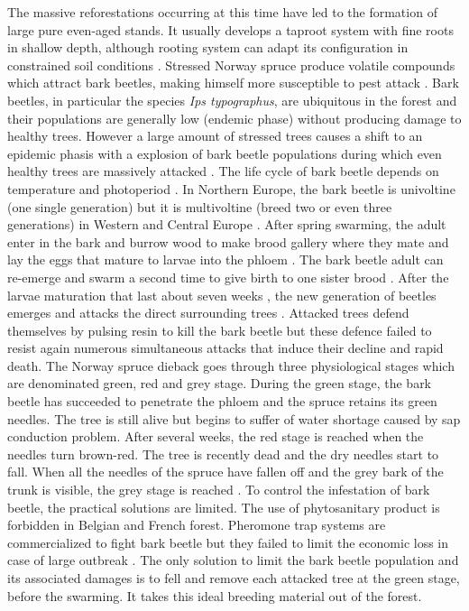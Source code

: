 \documentclass[3p,procedia]{elsarticle}
\begin{document}
The massive reforestations occurring at this time have led to the formation of large pure even-aged stands.
It usually develops a taproot system with fine roots in shallow depth, although rooting system can adapt its configuration in constrained soil conditions \citep{puhe_roots_2003,kostler_1968}.    
Stressed Norway spruce produce volatile compounds which attract bark beetles, making himself more susceptible to pest attack \citep{netherer_waterlimiting_2015,netherer_interactions_2021}.
Bark beetles, in particular the species \textit{Ips typographus}, are ubiquitous in the forest and their populations are generally low (endemic phase) without producing damage to healthy trees. 
However a large amount of stressed trees causes a shift to an epidemic phasis with a explosion of bark beetle populations during which even healthy trees are massively attacked \citep{kautz_individual_2014}.
The life cycle of bark beetle depends on temperature and photoperiod \citep{annila_influence_1969, baier_phenipscomprehensive_2007}.
In Northern Europe, the bark beetle is univoltine (one single generation) but it is multivoltine (breed two or even three generations) in Western and Central Europe \citep{annila_influence_1969}.
After spring swarming, the adult enter in the bark and burrow wood to make brood gallery where they mate and lay the eggs that mature to larvae into the phloem \citep{hlasny_bark_2021}.
The bark beetle adult can re-emerge and swarm a second time to give birth to one sister brood \citep{zolubas_1995}.
After the larvae maturation that last about seven weeks \citep{baier_phenipscomprehensive_2007}, the new generation of beetles emerges and attacks the direct surrounding trees \citep{zolubas_1995}.
Attacked trees defend themselves by pulsing resin to kill the bark beetle but these defence failed to resist again numerous simultaneous attacks that induce their decline and rapid death.
The Norway spruce dieback goes through three physiological stages which are denominated green, red and grey stage.
During the green stage, the bark beetle has succeeded to penetrate the phloem and the spruce retains its green needles. 
The tree is still alive but begins to suffer of water shortage caused by sap conduction problem. 
After several weeks, the red stage is reached when the needles turn brown-red. The tree is recently dead and the dry needles start to fall.
When all the needles of the spruce have fallen off and the grey bark of the trunk is visible, the grey stage is reached \citep{abdullah_european_2018}. 
To control the infestation of bark beetle, the practical solutions are limited. 
The use of phytosanitary product is forbidden in Belgian and French forest.
Pheromone trap systems are commercialized to fight bark beetle but they failed to limit the economic loss in case of large outbreak \citep{kuhn_pheromone_2022}.
The only solution to limit the bark beetle population and its associated damages is to fell and remove each attacked tree at the green stage, before the swarming.
It takes this ideal breeding material out of the forest.
\end{document}
